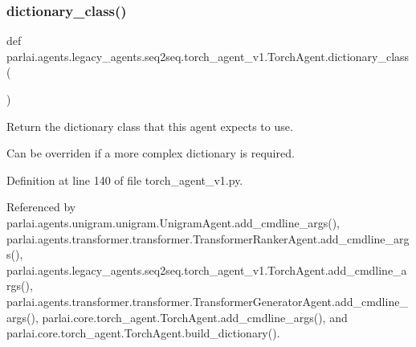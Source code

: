 \subsubsection{\texorpdfstring{dictionary\+\_\+class()}{dictionary\_class()}}
{\footnotesize\ttfamily def parlai.\+agents.\+legacy\+\_\+agents.\+seq2seq.\+torch\+\_\+agent\+\_\+v1.\+Torch\+Agent.\+dictionary\+\_\+class (\begin{DoxyParamCaption}{ }\end{DoxyParamCaption})\hspace{0.3cm}{\ttfamily [static]}}

\begin{DoxyVerb}Return the dictionary class that this agent expects to use.

Can be overriden if a more complex dictionary is required.
\end{DoxyVerb}
 

Definition at line 140 of file torch\+\_\+agent\+\_\+v1.\+py.



Referenced by parlai.\+agents.\+unigram.\+unigram.\+Unigram\+Agent.\+add\+\_\+cmdline\+\_\+args(), parlai.\+agents.\+transformer.\+transformer.\+Transformer\+Ranker\+Agent.\+add\+\_\+cmdline\+\_\+args(), parlai.\+agents.\+legacy\+\_\+agents.\+seq2seq.\+torch\+\_\+agent\+\_\+v1.\+Torch\+Agent.\+add\+\_\+cmdline\+\_\+args(), parlai.\+agents.\+transformer.\+transformer.\+Transformer\+Generator\+Agent.\+add\+\_\+cmdline\+\_\+args(), parlai.\+core.\+torch\+\_\+agent.\+Torch\+Agent.\+add\+\_\+cmdline\+\_\+args(), and parlai.\+core.\+torch\+\_\+agent.\+Torch\+Agent.\+build\+\_\+dictionary().

